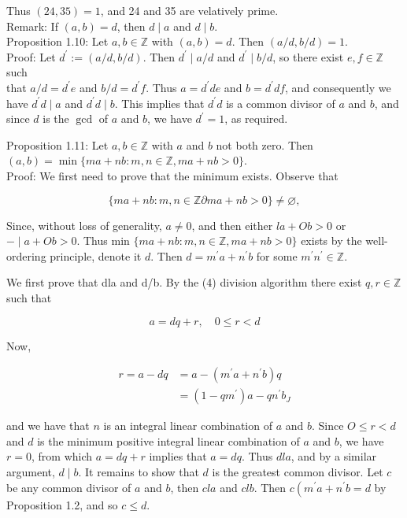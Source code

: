 \documentclass[10pt]{article}
\begin{document}
Thus $(24,35)=1$, and 24 and 35 are velatively prime.\\
Remark: If $(a, b)=d$, then $d \mid a$ and $d \mid b$.\\
Proposition 1.10: Let $a, b \in \mathbb{Z}$ with $(a, b)=d$. Then $(a / d, b / d)=1$.\\
Proof: Let $d^{\prime}:=(a / d, b / d)$. Then $d^{\prime} \mid a / d$ and $d^{\prime} \mid b / d$, so there exist $e, f \in \mathbb{Z}$ such\\
that $a / d=d^{\prime} e$ and $b / d=d^{\prime} f$. Thus $a=d^{\prime} d e$ and $b=d^{\prime} d f$, and consequently we have $d^{\prime} d \mid a$ and $d^{\prime} d \mid b$. This implies that $d^{\prime} d$ is a common divisor of $a$ and $b$, and since $d$ is the $\operatorname{gcd}$ of $a$ and $b$, we have $d^{\prime}=1$, as required.

Proposition 1.11: Let $a, b \in \mathbb{Z}$ with $a$ and $b$ not both zero. Then\\
$(a, b)=\min \{m a+n b: m, n \in \mathbb{Z}, m a+n b>0\}$.\\
Proof: We first need to prove that the minimum exists. Observe that

$$
\{m a+n b: m, n \in \mathbb{Z} \partial m a+n b>0\} \neq \varnothing,
$$

Since, without loss of generality, $a \neq 0$, and then either $l a+O b>0$ or $-\mid a+O b>0$. Thus min $\{m a+n b: m, n \in \mathbb{Z}, m a+n b>0\}$ exists by the well-ordering principle, denote it $d$. Then $d=m^{\prime} a+n^{\prime} b$ for some $m^{\prime} n^{\prime} \in \mathbb{Z}$.

We first prove that dla and d/b. By the (4) division algorithm there exist $q, r \in \mathbb{Z}$ such that

$$
a=d q+r, \quad 0 \leqslant r<d
$$

Now,

$$
\begin{aligned}
r=a-d q & =a-\left(m^{\prime} a+n^{\prime} b\right) q \\
& =\left(1-q m^{\prime}\right) a-q n^{\prime} b_{J}
\end{aligned}
$$

and we have that $n$ is an integral linear combination of $a$ and $b$. Since $O \leq r<d$ and $d$ is the minimum positive integral linear combination of $a$ and $b$, we have $r=0$, from which $a=d q+r$ implies that $a=d q$. Thus $d l a$, and by a similar argument, $d \mid b$. It remains to show that $d$ is the greatest common divisor. Let $c$ be any common divisor of $a$ and $b$, then $c l a$ and $c l b$. Then $c\left(m^{\prime} a+n^{\prime} b=d\right.$ by Proposition 1.2, and so $c \leqslant d$.
\end{document}
